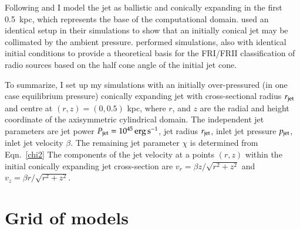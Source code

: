 Following \citet{komissarov98} and \citet{krause12} I model the jet as ballistic and conically expanding in the first 
0.5~kpc, which represents the base of the computational domain. \citet{komissarov98} used an identical setup in their simulations to show that an initially conical jet may be collimated by the ambient pressure. \citet{krause12} performed simulations, also with identical initial conditions to provide a theoretical basis for the FRI/FRII classification of radio sources based on the half cone angle of the initial jet cone.

To summarize, I set up my simulations with an initially over-pressured (in one case equilibrium pressure) conically expanding jet with cross-sectional radius $r_{\rm{jet}}$ and centre at $(r, z) = (0, 0.5)$ kpc, where $r$, and $z$ are the radial and height coordinate of the axisymmetric cylindrical domain.  The independent jet parameters are jet power $P_{\rm{jet}}=10^{45}\,\rm erg \, s^{-1}$, jet radius $r_{\rm{jet}}$, inlet jet pressure $p_{\rm{jet}}$, inlet jet velocity $\beta$. The remaining jet parameter $\chi$ is determined from Eqn.~\ref{chi2}
The components of the jet velocity at a points $(r, z)$ within the initial conically expanding jet cross-section are $v_r = \beta z/\sqrt{r^2 + z^2}$ and $v_z =\beta r/\sqrt{r^2 + z^2}$. 


%
%
\section{Grid of models} \label{s:code}


